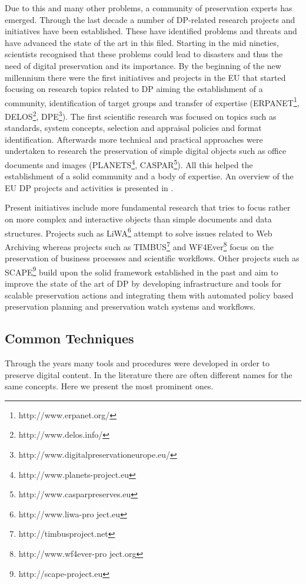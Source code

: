Due to this and many other problems, a community of preservation experts has emerged.
Through the last decade a number of DP-related research projects and initiatives have been established.
These have identified problems and threats and have advanced the state of the art in this filed.
Starting in the mid nineties, scientists recognised that these problems could lead to disasters and thus the need of digital preservation and its importance.
By the beginning of the new millennium there were the first initiatives and projects in the EU that started focusing on research topics related to DP aiming the establishment of a community, identification of target groups and transfer of expertise (ERPANET\footnote{http://www.erpanet.org/}, DELOS\footnote{http://www.delos.info/}, DPE\footnote{http://www.digitalpreservationeurope.eu/}).
The first scientific research was focused on topics such as standards, system concepts, selection and appraisal policies and format identification.
Afterwards more technical and practical approaches were undertaken to research the preservation of simple digital objects such as office documents and images (PLANETS\footnote{http://www.planets-project.eu}, CASPAR\footnote{http://www.casparpreserves.eu}).
All this helped the establishment of a solid community and a body of expertise.
An overview of the EU DP projects and activities is presented in \cite{strodl:2011:dpreport}.

Present initiatives include more fundamental research that tries to focus rather on more complex and interactive objects than simple documents and data structures. Projects such as LiWA\footnote{http://www.liwa-pro ject.eu} attempt to solve issues related to Web Archiving whereas projects such as TIMBUS\footnote{http://timbusproject.net} and WF4Ever\footnote{http://www.wf4ever-pro ject.org} focus on the preservation of business processes and scientific workflows.
Other projects such as SCAPE\footnote{http://scape-project.eu} build upon the solid framework established in the past and aim to improve the state of the art of DP by developing infrastructure and tools for scalable preservation actions and integrating them with automated policy based preservation planning and preservation watch systems and workflows.

\subsection{Common Techniques}
Through the years many tools and procedures were developed in order to preserve digital content. In the literature there are often different names for the same concepts. Here we present the most prominent ones. \newline


